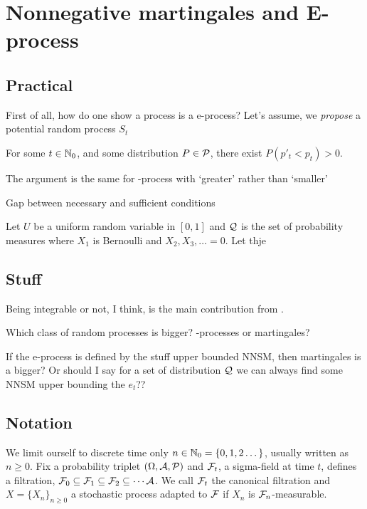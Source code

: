 \clearpage

\section{Nonnegative martingales and E-process}

\subsection{Practical}

First of all, how do one show a process is a e-process? Let's assume, we \emph{propose}
a potential random process $S_t$

\begin{define}[inadmissible]
	For some $t\in\mathbb{N}_0$, and some distribution $P\in\mathcal{P}$, there exist $P(p'_t < p_t) >0$.
\end{define}
The argument is the same for \E-process with `greater' rather than `smaller'


Gap between necessary and sufficient conditions
\begin{example}
	Let $U$ be a uniform random variable in $[0,1]$ and $\mathcal{Q}$ is the set of
	probability measures where $X_1$ is Bernoulli and $X_2,X_3,\dots=0$.
	Let thje
\end{example}

\subsection{Stuff}
Being integrable or not, I think, is the main contribution from \cite{wangExtendedVillesInequality2024}.

\begin{question}
	Which class of random processes is bigger? \E-processes or martingales?
\end{question}

If the e-process is defined by the stuff upper bounded NNSM, then martingales is a bigger?
Or should I say for a set of distribution $\mathcal{Q}$ we can always find some NNSM
upper bounding the $e_t$??

\subsection{Notation}
We limit ourself to discrete time only $n\in\mathbb{N}_0=\{0,1,2\dots\}$, usually written as $n\geq 0$.
Fix a probability triplet $(\Omega,\mathcal{A},\mathcal{P})$ and $\mathcal{F}_t$, a sigma-field at time $t$, defines
a filtration, $\mathcal{F}_0\subseteq\mathcal{F}_1\subseteq\mathcal{F}_2\subseteq\cdots\mathcal{A}$.
We call $\mathcal{F}_t$ the canonical filtration and $X=\{X_n\}_{n\geq 0}$ a stochastic
process adapted to $\mathcal{F}$ if $X_n$ is $\mathcal{F}_n$-measurable.



